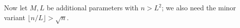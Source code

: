 \begin{definition}
\label{params-set}
\leanok
Now let $M,L$ be additional parameters with $n > L^2$; we also need the minor
  variant $\lfloor n/L \rfloor > \sqrt{n}$.
\end{definition}
